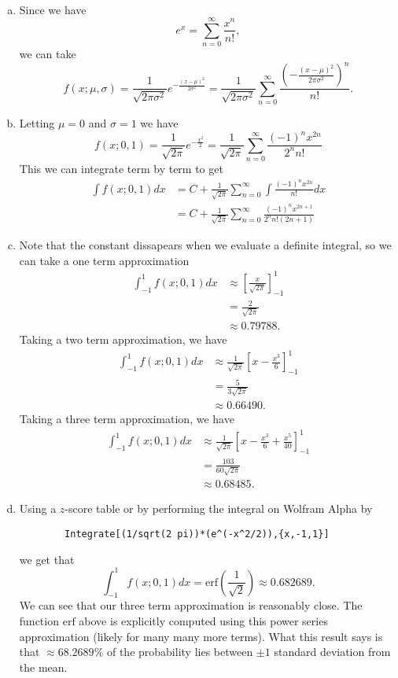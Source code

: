 \documentclass[12pt]{article} %
\begin{document}
\begin{solution}~
\begin{enumerate}[(a)]
    \item Since we have
    \[
    e^x = \sum_{n=0}^\infty \frac{x^n}{n!},
    \]
    we can take
    \[
    f(x;\mu,\sigma)=\frac{1}{\sqrt{2\pi \sigma^2}} e^{-\frac{(x-\mu)^2}{2\sigma^2}} = \frac{1}{\sqrt{2 \pi \sigma^2}} \sum_{n=0}^\infty \frac{\left(-\frac{(x-\mu)^2}{2\pi \sigma^2}\right)^n}{n!}.
    \]
    \item Letting $\mu=0$ and $\sigma=1$ we have
    \[
    f(x;0,1)=\frac{1}{\sqrt{2\pi}} e^{-\frac{x^2}{2}}=\frac{1}{\sqrt{2\pi}} \sum_{n=0}^\infty \frac{(-1)^n x^{2n}}{2^nn!}
    \]
    This we can integrate term by term to get
    \begin{align*}
        \int f(x;0,1) dx &= C+\frac{1}{\sqrt{2\pi}} \sum_{n=0}^\infty \int \frac{(-1)^nx^{2n}}{n!}dx\\
        &= C+ \frac{1}{\sqrt{2\pi}} \sum_{n=0}^\infty \frac{(-1)^n x^{2n+1}}{2^n n! (2n+1)}
    \end{align*}
    \item Note that the constant dissapears when we evaluate a definite integral, so we can take a one term approximation
    \begin{align*}
    \int_{-1}^1 f(x;0,1)dx &\approx \left[\frac{x}{\sqrt{2\pi}}\right]_{-1}^1\\
    &= \frac{2}{\sqrt{2\pi}}\\
    &\approx 0.79788.
    \end{align*}
    Taking a two term approximation, we have
    \begin{align*}
    \int_{-1}^1 f(x;0,1)dx &\approx \frac{1}{\sqrt{2\pi}}\left[x-\frac{x^3}{6}\right]_{-1}^1\\
    &= \frac{5}{3\sqrt{2\pi}}\\
    &\approx 0.66490.
    \end{align*}
    Taking a three term approximation, we have
    \begin{align*}
    \int_{-1}^1 f(x;0,1)dx &\approx \frac{1}{\sqrt{2\pi}}\left[x-\frac{x^3}{6}+\frac{x^5}{40}\right]_{-1}^1\\
    &= \frac{103}{60\sqrt{2\pi}}\\
    &\approx 0.68485.
    \end{align*}
    \item Using a $z$-score table or by performing the integral on Wolfram Alpha by
    \begin{verbatim}
        Integrate[(1/sqrt(2 pi))*(e^(-x^2/2)),{x,-1,1}]
    \end{verbatim}
    we get that
    \[
    \int_{-1}^1 f(x;0,1)dx = \mathrm{erf}\left(\frac{1}{\sqrt{2}}\right) \approx 0.682689.
    \]
    We can see that our three term approximation is reasonably close. The function $\mathrm{erf}$ above is explicitly computed using this power series approximation (likely for many many more terms).  What this result says is that $\approx 68.2689\%$ of the probability lies between $\pm 1$ standard deviation from the mean.
\end{enumerate}
\end{solution}
\end{document}
